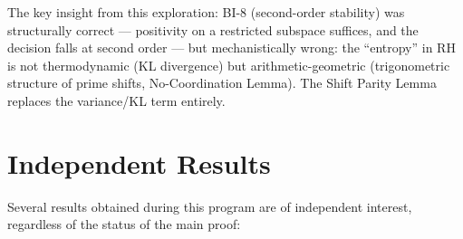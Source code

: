 \documentclass[12pt,a4paper]{article}
\theoremstyle{definition}
\theoremstyle{remark}
\begin{document}
\noindent The key insight from this exploration: BI-8 (second-order stability) was structurally correct --- positivity on a restricted subspace suffices, and the decision falls at second order --- but mechanistically wrong: the ``entropy'' in RH is not thermodynamic (KL divergence) but arithmetic-geometric (trigonometric structure of prime shifts, No-Coordination Lemma). The Shift Parity Lemma replaces the variance/KL term entirely.


\needspace{10cm}
\section{Independent Results}
\label{sec:independent-results}

Several results obtained during this program are of independent interest, regardless of the status of the main proof:
\end{document}
